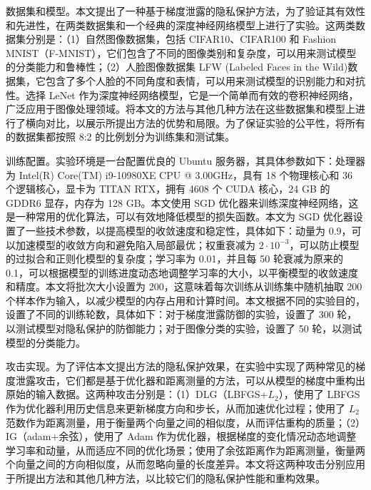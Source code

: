 
数据集和模型。本文提出了一种基于梯度泄露的隐私保护方法，为了验证其有效性和先进性，在两类数据集和一个经典的深度神经网络模型上进行了实验。这两类数据集分别是：（1）自然图像数据集，包括 CIFAR10\cite{cifar10}、CIFAR100\cite{cifar10} 和 Fashion MNIST（F-MNIST）\cite{Fashion-MNIST}，它们包含了不同的图像类别和复杂度，可以用来测试模型的分类能力和鲁棒性；（2）人脸图像数据集 LFW (Labeled Faces in the Wild)数据集\cite{LFW}，它包含了多个人脸的不同角度和表情，可以用来测试模型的识别能力和对抗性。选择 LeNet 作为深度神经网络模型，它是一个简单而有效的卷积神经网络，广泛应用于图像处理领域。将本文的方法与其他几种方法在这些数据集和模型上进行了横向对比，以展示所提出方法的优势和局限。为了保证实验的公平性，将所有的数据集都按照 8:2 的比例划分为训练集和测试集。

训练配置。实验环境是一台配置优良的 Ubuntu 服务器，其具体参数如下：处理器为 Intel(R) Core(TM) i9-10980XE CPU @ 3.00GHz，具有 18 个物理核心和 36 个逻辑核心，显卡为 TITAN RTX，拥有 4608 个 CUDA 核心，24 GB 的 GDDR6 显存，内存为 128 GB。本文使用 SGD 优化器来训练深度神经网络，这是一种常用的优化算法，可以有效地降低模型的损失函数。本文为 SGD 优化器设置了一些技术参数，以提高模型的收敛速度和稳定性，具体如下：动量为 0.9，可以加速模型的收敛方向和避免陷入局部最优；权重衰减为 $2\cdot 10^{-3}$，可以防止模型的过拟合和正则化模型的复杂度；学习率为 0.01，并且每 50 轮衰减为原来的 0.1，可以根据模型的训练进度动态地调整学习率的大小，以平衡模型的收敛速度和精度。本文将批次大小设置为 200，这意味着每次训练从训练集中随机抽取 200 个样本作为输入，以减少模型的内存占用和计算时间。本文根据不同的实验目的，设置了不同的训练轮数，具体如下：对于梯度泄露防御的实验，设置了 300 轮，以测试模型对隐私保护的防御能力；对于图像分类的实验，设置了 50 轮，以测试模型的分类能力。

攻击实现。为了评估本文提出方法的隐私保护效果，在实验中实现了两种常见的梯度泄露攻击，它们都是基于优化器和距离测量的方法，可以从模型的梯度中重构出原始的输入数据。这两种攻击分别是：（1）DLG（LBFGS+$L_2$）\cite{DLG}，使用了 LBFGS 作为优化器利用历史信息来更新梯度方向和步长，从而加速优化过程；使用了 $L_2$ 范数作为距离测量，用于衡量两个向量之间的相似度，从而评估重构的质量；（2）IG（adam+余弦）\cite{Inverting_Gradients}，使用了 Adam 作为优化器，根据梯度的变化情况动态地调整学习率和动量，从而适应不同的优化场景；使用了余弦距离作为距离测量，衡量两个向量之间的方向相似度，从而忽略向量的长度差异。本文将这两种攻击分别应用于所提出方法和其他几种方法，以比较它们的隐私保护性能和重构效果。

